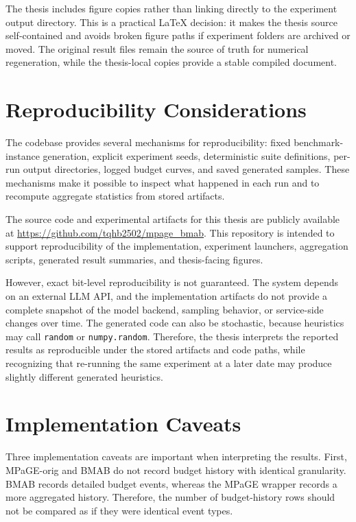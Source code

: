 \documentclass[../main.tex]{subfiles}
\begin{document}
The thesis includes figure copies rather than linking directly to the experiment output directory. This is a practical LaTeX decision: it makes the thesis source self-contained and avoids broken figure paths if experiment folders are archived or moved. The original result files remain the source of truth for numerical regeneration, while the thesis-local copies provide a stable compiled document.

\section{Reproducibility Considerations}

The codebase provides several mechanisms for reproducibility: fixed benchmark-instance generation, explicit experiment seeds, deterministic suite definitions, per-run output directories, logged budget curves, and saved generated samples. These mechanisms make it possible to inspect what happened in each run and to recompute aggregate statistics from stored artifacts.

The source code and experimental artifacts for this thesis are publicly available at \url{https://github.com/tqhb2502/mpage_bmab}. This repository is intended to support reproducibility of the implementation, experiment launchers, aggregation scripts, generated result summaries, and thesis-facing figures.

However, exact bit-level reproducibility is not guaranteed. The system depends on an external LLM API, and the implementation artifacts do not provide a complete snapshot of the model backend, sampling behavior, or service-side changes over time. The generated code can also be stochastic, because heuristics may call \texttt{random} or \texttt{numpy.random}. Therefore, the thesis interprets the reported results as reproducible under the stored artifacts and code paths, while recognizing that re-running the same experiment at a later date may produce slightly different generated heuristics.

\section{Implementation Caveats}

Three implementation caveats are important when interpreting the results. First, MPaGE-orig and BMAB do not record budget history with identical granularity. BMAB records detailed budget events, whereas the MPaGE wrapper records a more aggregated history. Therefore, the number of budget-history rows should not be compared as if they were identical event types.
\end{document}
